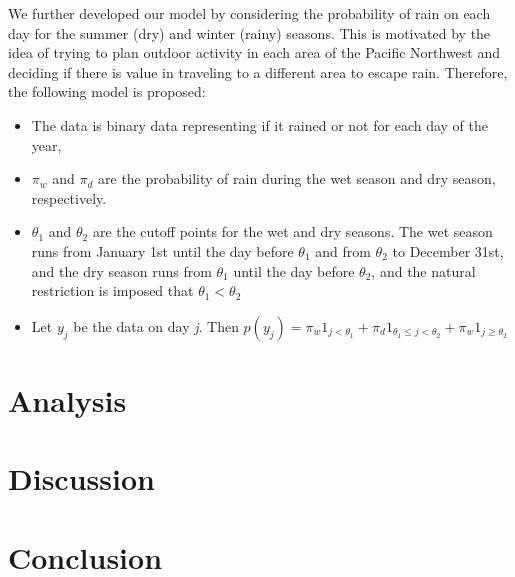 \documentclass{article}
\begin{document}

We further developed our model by considering the probability of rain on each day for the summer (dry) and winter (rainy) seasons. This is motivated by the idea of trying to plan outdoor activity in each area of the Pacific Northwest and deciding if there is value in traveling to a different area to escape rain.
Therefore, the following model is proposed:
\begin{itemize}
\item The data is binary data representing if it rained or not for each day of the year,
\item $\pi_w$ and $\pi_d$ are the probability of rain during the wet season and dry season, respectively.
\item $\theta_1$ and $\theta_2$ are the cutoff points for the wet and dry seasons. The wet season runs from January 1st until the day before $\theta_1$ and from $\theta_2$ to December 31st, and the dry season runs from $\theta_1$ until the day before $\theta_2$, and the natural restriction is imposed that $\theta_1 < \theta_2$
\item Let $y_j$ be the data on day \textit{j}. Then $p(y_j) = \pi_w  1_{j < \theta_1} + \pi_d  1_{\theta_1\leq j < \theta_2} +\pi_w  1_{j \geq \theta_2} $
\end{itemize}

\section{Analysis}

\section{Discussion}

\section{Conclusion}
\end{document}
